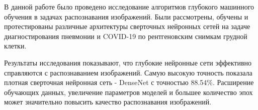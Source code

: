 В данной работе было проведено исследование алгоритмов глубокого машинного обучения в задачах распознавания изображений. Были рассмотрены, обучены и протестированы различные архитектуры сверточных нейронных сетей на задаче диагностирования пневмонии и COVID-19 по рентгеновским снимкам грудной клетки. 

Результаты исследования показывают, что глубокие нейронные сети эффективно справляются с распознаванием изображений. Самую высокую точность показала плотная сверточная нейронная сеть - DenseNet с точностью 88.54\%.
Расширение обучающих данных, увеличение параметров моделей и большее количество эпох может значительно повысить качество распознавания изображений.

\clearpage
